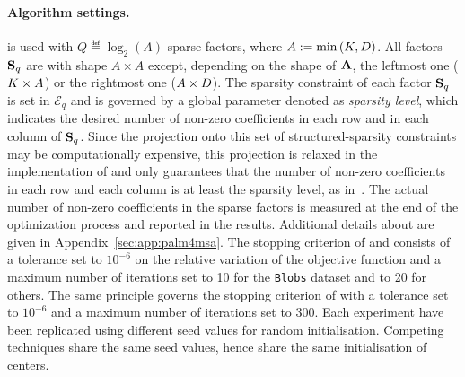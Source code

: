 \paragraph{Algorithm settings.} 
\qkmeans is used with $Q\eqdef\log_2\left (A\right )$ sparse factors, where  $A:=\min\left (K, D\right )$. 
All factors ${\mathbf{S}}_q$ are with shape $A \times A$ except, depending on the shape of ${\mathbf{A}}$, the leftmost one ($K\times A$) or the rightmost one ($A\times D$). 
The sparsity constraint of each factor ${\mathbf{S}}_q$ is set in $\mathcal{E}_q$ and is governed by a global parameter denoted as \textit{sparsity level}, which indicates the desired number of non-zero coefficients in each row and in each column of ${\mathbf{S}}_q$. 
Since the projection onto this set of structured-sparsity constraints may be computationally expensive, this projection is relaxed in the implementation of \palm and only guarantees that the number of non-zero coefficients in each row and each column is at least the sparsity level, as in~\cite{LeMagoarou2016Flexible}.
The actual number of non-zero coefficients in the sparse factors is measured at the end of the optimization process and reported in the results.
Additional details about \palm are given in Appendix~\ref{sec:app:palm4msa}.
The stopping criterion of \kmeans and \qkmeans consists of a tolerance set to $10^{-6}$ on the relative variation of the objective function and a maximum number of iterations set to 10 for the \texttt{Blobs} dataset and to 20 for others. 
The same principle governs the stopping criterion of \palm with a tolerance set to $10^{-6}$ and a maximum number of iterations set to 300. Each experiment have been replicated using different seed values for random initialisation. 
Competing techniques share the same seed values, hence share the same initialisation of centers.

%

